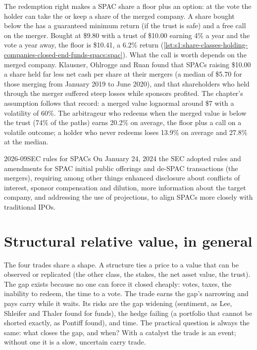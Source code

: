 The redemption right makes a SPAC share a floor plus an option: at the vote the holder can take the  or keep a share of the merged company. A
share bought below the  has a guaranteed minimum return (if the trust is safe) and a free call on the merger. Bought at \$9.80 with a trust of
\$10.00 earning 4\% a year and the vote a year away, the floor is \$10.41, a 6.2\% return (\cref{lst:s1:share-classes-holding-companies-closed-end-funds-spacs:spac}).
What the call is worth depends on the merged company. Klausner, Ohlrogge and Ruan found that SPACs raising \$10.00 a share held far less net cash per share
at their mergers (a median of \$5.70 for those merging from January 2019 to June 2020), and that shareholders who held through the merger suffered steep
losses while sponsors profited. The chapter's assumption follows that record: a merged value lognormal around \$7 with a volatility of 60\%. The arbitrageur
who redeems when the merged value is below the trust (74\% of the paths) earns 20.2\% on average, the floor plus a call on a volatile outcome; a holder who
never redeems loses 13.9\% on average and 27.8\% at the median.

\begin{dated}{2026-09}{SEC rules for SPACs}\label{dat:s1:share-classes-holding-companies-closed-end-funds-spacs:sec}
On January 24, 2024 the SEC adopted rules and amendments for SPAC initial public offerings and de-SPAC transactions (the mergers), requiring among other
things enhanced disclosure about conflicts of interest, sponsor compensation and dilution, more information about the target company, and addressing the
use of projections, to align SPACs more closely with traditional IPOs.
\end{dated}

\section{Structural relative value, in general}

The four trades share a shape. A structure ties a price to a value that can be observed or replicated (the other class, the stakes, the net asset value,
the trust). The gap exists because no one can force it closed cheaply: votes, taxes, the inability to redeem, the time to a vote. The trade earns the gap's
narrowing and pays carry while it waits. Its risks are the gap widening (sentiment, as Lee, Shleifer and Thaler found for funds), the hedge failing (a
portfolio that cannot be shorted exactly, as Pontiff found), and time. The practical question is always the same: what closes the gap, and when? With a
catalyst the trade is an event; without one it is a slow, uncertain carry trade.

